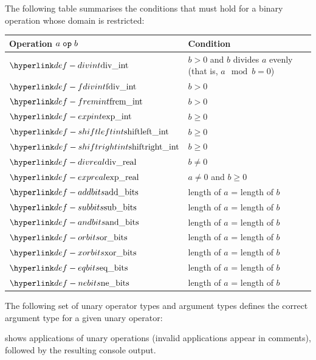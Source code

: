 The following table summarises the conditions that must hold for a binary operation whose domain is restricted:
\begin{center}
\begin{tabular}{|l|l|}
\hline
\textbf{Operation} $a\;\texttt{op}\;b$& \textbf{Condition}\\
\hline
$\divint$         & $b > 0$ and $b$ divides $a$ evenly (that is, $a \mod b = 0$)\\
$\fdivint$        & $b > 0$\\
$\fremint$        & $b > 0$\\
$\expint$         & $b \geq 0$\\
$\shiftleftint$   & $b \geq 0$\\
$\shiftrightint$  & $b \geq 0$\\
$\divreal$        & $b \neq 0$\\
$\expreal$        & $a \neq 0$ and $b \geq 0$\\
$\addbits$        & length of $a$ = length of $b$\\
$\subbits$        & length of $a$ = length of $b$\\
$\andbits$        & length of $a$ = length of $b$\\
$\orbits$         & length of $a$ = length of $b$\\
$\xorbits$        & length of $a$ = length of $b$\\
$\eqbits$         & length of $a$ = length of $b$\\
$\nebits$         & length of $a$ = length of $b$\\
\hline
\end{tabular}
\end{center}


The following set of unary operator types and argument types defines the correct argument type
for a given unary operator:

 shows applications of unary operations
(invalid applications appear in comments),
followed by the resulting console output.


